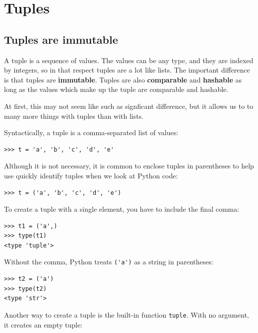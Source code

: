 \documentclass[10pt]{book}
\begin{document}
\chapter{Tuples}
\label{tuplechap}

\section{Tuples are immutable}


A tuple is a sequence of values.  The values can be any type, and
they are indexed by integers, so in that respect tuples are a lot
like lists.  The important difference is that tuples are {\bf immutable}.
Tuples are also {\bf comparable} and {\bf hashable} as long as the 
values which make up the tuple are comparable and hashable.

At first, this may not seem like such as signficant difference, but
it allows us to to many more things with tuples than with lists.

Syntactically, a tuple is a comma-separated list of values:

\beforeverb
\begin{verbatim}
>>> t = 'a', 'b', 'c', 'd', 'e'
\end{verbatim}
\afterverb
%
Although it is not necessary, it is common to enclose tuples in
parentheses to help use quickly identify tuples when we look at
Python code:


\beforeverb
\begin{verbatim}
>>> t = ('a', 'b', 'c', 'd', 'e')
\end{verbatim}
\afterverb
%
To create a tuple with a single element, you have to include the final
comma:


\beforeverb
\begin{verbatim}
>>> t1 = ('a',)
>>> type(t1)
<type 'tuple'>
\end{verbatim}
\afterverb
%
Without the comma, Python treats \verb"('a')" as a string in
parentheses:

\beforeverb
\begin{verbatim}
>>> t2 = ('a')
>>> type(t2)
<type 'str'>
\end{verbatim}
\afterverb
%
Another way to create a tuple is the built-in function {\tt tuple}.
With no argument, it creates an empty tuple:
\end{document}
